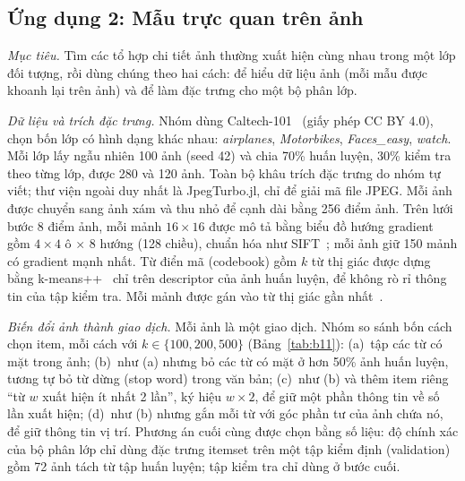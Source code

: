 \subsection{Ứng dụng 2: Mẫu trực quan trên ảnh}
\label{sec:bovw}

\emph{Mục tiêu.} Tìm các tổ hợp chi tiết ảnh thường xuất hiện cùng nhau trong một lớp đối tượng, rồi dùng chúng theo hai cách: để hiểu dữ liệu ảnh (mỗi mẫu được khoanh lại trên ảnh) và để làm đặc trưng cho một bộ phân lớp.

\emph{Dữ liệu và trích đặc trưng.} Nhóm dùng Caltech-101~\cite{feifei2004learning} (giấy phép CC BY 4.0), chọn bốn lớp có hình dạng khác nhau: \emph{airplanes}, \emph{Motorbikes}, \emph{Faces\_easy}, \emph{watch}. Mỗi lớp lấy ngẫu nhiên 100 ảnh (seed 42) và chia 70\% huấn luyện, 30\% kiểm tra theo từng lớp, được 280 và 120 ảnh. Toàn bộ khâu trích đặc trưng do nhóm tự viết; thư viện ngoài duy nhất là JpegTurbo.jl, chỉ để giải mã file JPEG. Mỗi ảnh được chuyển sang ảnh xám và thu nhỏ để cạnh dài bằng 256 điểm ảnh. Trên lưới bước 8 điểm ảnh, mỗi mảnh $16 \times 16$ được mô tả bằng biểu đồ hướng gradient gồm $4 \times 4$ ô $\times$ 8 hướng (128 chiều), chuẩn hóa như SIFT~\cite{lowe2004distinctive,dalal2005histograms}; mỗi ảnh giữ 150 mảnh có gradient mạnh nhất. Từ điển mã (codebook) gồm $k$ từ thị giác được dựng bằng k-means++~\cite{arthur2007kmeans} chỉ trên descriptor của ảnh huấn luyện, để không rò rỉ thông tin của tập kiểm tra. Mỗi mảnh được gán vào từ thị giác gần nhất~\cite{sivic2003video,csurka2004visual}.

\emph{Biến đổi ảnh thành giao dịch.} Mỗi ảnh là một giao dịch. Nhóm so sánh bốn cách chọn item, mỗi cách với $k \in \{100, 200, 500\}$ (Bảng~\ref{tab:b11}): (a)~tập các từ có mặt trong ảnh; (b)~như (a) nhưng bỏ các từ có mặt ở hơn 50\% ảnh huấn luyện, tương tự bỏ từ dừng (stop word) trong văn bản; (c)~như (b) và thêm item riêng ``từ $w$ xuất hiện ít nhất 2 lần'', ký hiệu $w{\times}2$, để giữ một phần thông tin về số lần xuất hiện; (d)~như (b) nhưng gắn mỗi từ với góc phần tư của ảnh chứa nó, để giữ thông tin vị trí. Phương án cuối cùng được chọn bằng số liệu: độ chính xác của bộ phân lớp chỉ dùng đặc trưng itemset trên một tập kiểm định (validation) gồm 72 ảnh tách từ tập huấn luyện; tập kiểm tra chỉ dùng ở bước cuối.

